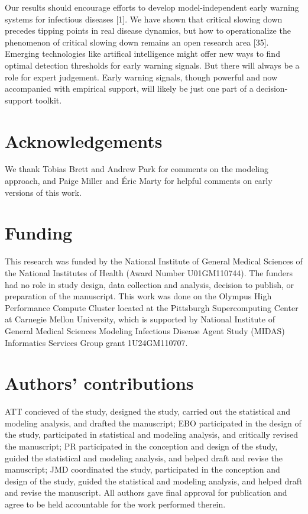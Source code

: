 \documentclass[3p]{elsarticle} %
\begin{document}
Our results should encourage efforts to develop model-independent early
warning systems for infectious diseases {[}1{]}. We have shown that
critical slowing down precedes tipping points in real disease dynamics,
but how to operationalize the phenomenon of critical slowing down
remains an open research area {[}35{]}. Emerging technologies like
artifical intelligence might offer new ways to find optimal detection
thresholds for early warning signals. But there will always be a role
for expert judgement. Early warning signals, though powerful and now
accompanied with empirical support, will likely be just one part of a
decision-support toolkit.

\hypertarget{acknowledgements}{%
\section{Acknowledgements}\label{acknowledgements}}

We thank Tobias Brett and Andrew Park for comments on the modeling
approach, and Paige Miller and Éric Marty for helpful comments on early
versions of this work.

\hypertarget{funding}{%
\section{Funding}\label{funding}}

This research was funded by the National Institute of General Medical
Sciences of the National Institutes of Health (Award Number
U01GM110744). The funders had no role in study design, data collection
and analysis, decision to publish, or preparation of the manuscript.
This work was done on the Olympus High Performance Compute Cluster
located at the Pittsburgh Supercomputing Center at Carnegie Mellon
University, which is supported by National Institute of General Medical
Sciences Modeling Infectious Disease Agent Study (MIDAS) Informatics
Services Group grant 1U24GM110707.

\hypertarget{authors-contributions}{%
\section{Authors' contributions}\label{authors-contributions}}

ATT concieved of the study, designed the study, carried out the
statistical and modeling analysis, and drafted the manuscript; EBO
participated in the design of the study, participated in statistical and
modeling analysis, and critically revised the manuscript; PR
participated in the conception and design of the study, guided the
statistical and modeling analysis, and helped draft and revise the
manuscript; JMD coordinated the study, participated in the conception
and design of the study, guided the statistical and modeling analysis,
and helped draft and revise the manuscript. All authors gave final
approval for publication and agree to be held accountable for the work
performed therein.
\end{document}
